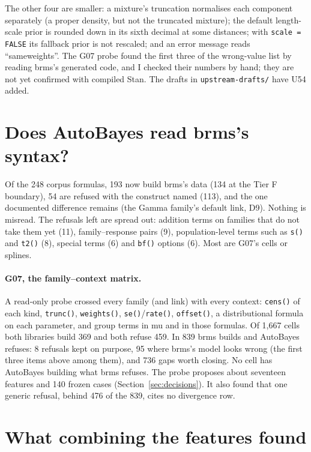 \documentclass[11pt]{article}
\newcommand{\code}[1]{\texttt{#1}}
\newcommand{\file}[1]{\texttt{#1}}
\begin{document}
The other four are smaller: a mixture's truncation normalises each component separately (a proper density, but not the
truncated mixture); the default length-scale prior is rounded down in its sixth decimal at some distances; with
\code{scale = FALSE} its fallback prior is not rescaled; and an error message reads ``sameweights''. The G07 probe found the
first three of the wrong-value list by reading brms's generated code, and I checked their numbers by hand; they are not yet
confirmed with compiled Stan. The drafts in \file{upstream-drafts/} have U54 added.

\section{Does AutoBayes read brms's syntax?}

Of the 248 corpus formulas, 193 now build brms's data (134 at the Tier F boundary), 54 are refused with the construct named
(113), and the one documented difference remains (the Gamma family's default link, D9). Nothing is misread. The refusals
left are spread out: addition terms on families that do not take them yet (11), family--response pairs (9), population-level
terms such as \code{s()} and \code{t2()} (8), special terms (6) and \code{bf()} options (6). Most are G07's cells or splines.

\paragraph{G07, the family--context matrix.} A read-only probe crossed every family (and link) with every context:
\code{cens()} of each kind, \code{trunc()}, \code{weights()}, \code{se()}/\code{rate()}, \code{offset()}, a distributional
formula on each parameter, and group terms in mu and in those formulas. Of 1{,}667 cells both libraries build 369 and both
refuse 459. In 839 brms builds and AutoBayes refuses: 8 refusals kept on purpose, 95 where brms's model looks wrong (the
first three items above among them), and 736 gaps worth closing. No cell has AutoBayes building what brms refuses. The probe
proposes about seventeen features and 140 frozen cases (Section~\ref{sec:decisions}). It also found that one generic
refusal, behind 476 of the 839, cites no divergence row.

\section{What combining the features found}
\end{document}
